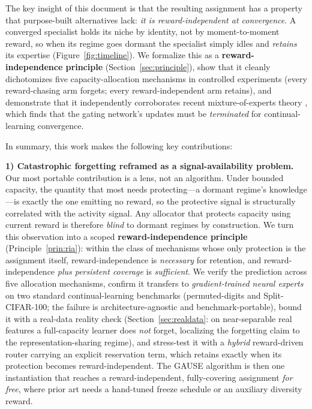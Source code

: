\documentclass[10pt]{article}
\begin{document}
The key insight of this document is that the resulting assignment has a property
that purpose-built alternatives lack: \emph{it is reward-independent at
convergence}. A converged specialist holds its niche by identity, not by
moment-to-moment reward, so when its regime goes dormant the specialist simply
idles and \emph{retains} its expertise (Figure~\ref{fig:timeline}). We formalize
this as a
\textbf{reward-independence principle} (Section~\ref{sec:principle}), show that
it cleanly dichotomizes five capacity-allocation mechanisms in controlled
experiments (every reward-chasing arm forgets; every reward-independent arm
retains), and demonstrate that it independently corroborates recent
mixture-of-experts theory \cite{li2024moecl}, which finds that the gating
network's updates must be \emph{terminated} for continual-learning convergence.

In summary, this work makes the following key contributions:

\textbf{1) Catastrophic forgetting reframed as a signal-availability problem.}
Our most portable contribution is a lens, not an algorithm. Under bounded capacity,
the quantity that most needs protecting---a dormant regime's knowledge---is exactly
the one emitting no reward, so the protective signal is structurally correlated with
the activity signal. Any allocator that protects capacity using current reward is
therefore \emph{blind} to dormant regimes by construction. We turn this observation
into a scoped \textbf{reward-independence principle}
(Principle~\ref{prin:ria}): within the class of mechanisms whose only protection is
the assignment itself, reward-independence is \emph{necessary} for retention, and
reward-independence \emph{plus persistent coverage} is \emph{sufficient}. We verify
the prediction across five allocation mechanisms, confirm it transfers to
\emph{gradient-trained neural experts} on two standard continual-learning benchmarks
(permuted-digits and Split-CIFAR-100; the failure is architecture-agnostic and
benchmark-portable), bound it with a real-data reality check
(Section~\ref{sec:realdata}: on near-separable real features a full-capacity learner
does \emph{not} forget, localizing the forgetting claim to the representation-sharing
regime), and stress-test it with a \emph{hybrid} reward-driven router carrying an
explicit reservation term, which retains exactly when its protection becomes
reward-independent. The GAUSE algorithm is then one
instantiation that reaches a reward-independent, fully-covering assignment
\emph{for free}, where prior art needs a hand-tuned freeze schedule or an auxiliary
diversity reward.
\end{document}

